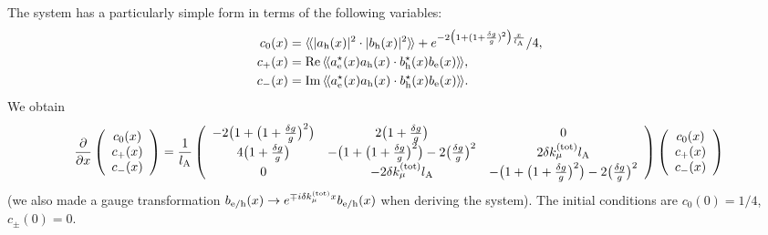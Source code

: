\documentclass[pra,aps,a4paper,twocolumn,superscriptaddress,longbibliography]{revtex4-2}
\newcommand{\rngl}{\rangle\hspace{-0.05cm}\rangle}
\newcommand{\lngl}{\langle\hspace{-0.05cm}\langle}
\newcommand{\lA}{l_{\rm A}}
\begin{document}
The system has a particularly simple form in terms of the following variables:
\begin{align}
c_0(x) &= \lngl |a_{\rm h}(x)|^2 \cdot |b_{\rm h}(x)|^2 \rngl + e^{-2\big(1+(1+\frac{\delta g}{g})^2\big) \frac{x}{\lA}} / 4,\label{eq:c0}\\
c_+(x) &= {\rm Re}\,\lngl a_{\rm e}^\star(x)a_{\rm h}(x) \cdot b_{\rm h}^\star (x)b_{\rm e}(x)\rngl,\label{eq:cp}\\
c_-(x) &= {\rm Im}\,\lngl a_{\rm e}^\star(x)a_{\rm h}(x) \cdot b_{\rm h}^\star (x)b_{\rm e}(x)\rngl.\label{eq:cm}
\end{align}
We obtain
\begin{equation}\label{eq:system}
\frac{\partial}{\partial x}\left(\begin{array}{c}
c_0(x)\\
c_+(x)\\
c_-(x)
\end{array}\right)=
\frac{1}{\lA}\left(\begin{array}{ccc}
-2\big( 1+\big(1+\frac{\delta g}{g}\big)^{2}\big)  & 2\big(1+\frac{\delta g}{g}\big) & 0\\
4\big(1+\frac{\delta g}{g}\big) & -\big( 1+\big(1 + \frac{\delta g}{g}\big)^{2}\big) -2\big(\frac{\delta g}{g}\big)^{2} & 2\delta k_\mu^{\rm (tot)}\lA\\
0 & -2\delta k_\mu^{\rm (tot)}\lA & -\big( 1+\big(1 + \frac{\delta g}{g}\big)^{2}\big) -2\big(\frac{\delta g}{g}\big)^{2}
\end{array}\right)\left(\begin{array}{c}
c_0(x)\\
c_+(x)\\
c_-(x)
\end{array}\right)
\end{equation}
(we also made a gauge transformation $b_{\rm e/h}(x) \rightarrow e^{\mp i\delta k_{\mu}^{\rm (tot)} x} b_{\rm e/h}(x)$ when deriving the system). The initial conditions are $c_0(0) = 1/4$, $c_\pm (0) = 0$. 
\end{document}
